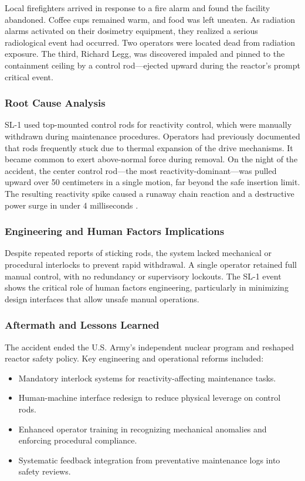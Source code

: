\documentclass[12pt]{article}
\begin{document}
Local firefighters arrived in response to a fire alarm and found the facility abandoned. Coffee cups remained warm, and food was left uneaten. As radiation alarms activated on their dosimetry equipment, they realized a serious radiological event had occurred. Two operators were located dead from radiation exposure. The third, Richard Legg, was discovered impaled and pinned to the containment ceiling by a control rod—ejected upward during the reactor’s prompt critical event.

\subsubsection{Root Cause Analysis}

SL-1 used top-mounted control rods for reactivity control, which were manually withdrawn during maintenance procedures. Operators had previously documented that rods frequently stuck due to thermal expansion of the drive mechanisms. It became common to exert above-normal force during removal. On the night of the accident, the center control rod—the most reactivity-dominant—was pulled upward over 50 centimeters in a single motion, far beyond the safe insertion limit. The resulting reactivity spike caused a runaway chain reaction and a destructive power surge in under 4 milliseconds \autocite{sl1report}.

\subsubsection{Engineering and Human Factors Implications}

Despite repeated reports of sticking rods, the system lacked mechanical or procedural interlocks to prevent rapid withdrawal. A single operator retained full manual control, with no redundancy or supervisory lockouts. The SL-1 event shows the critical role of human factors engineering, particularly in minimizing design interfaces that allow unsafe manual operations.

\subsubsection{Aftermath and Lessons Learned}

The accident ended the U.S. Army’s independent nuclear program and reshaped reactor safety policy. Key engineering and operational reforms included:
\begin{itemize}
  \item Mandatory interlock systems for reactivity-affecting maintenance tasks.
  \item Human-machine interface redesign to reduce physical leverage on control rods.
  \item Enhanced operator training in recognizing mechanical anomalies and enforcing procedural compliance.
  \item Systematic feedback integration from preventative maintenance logs into safety reviews.
\end{itemize}
\end{document}
